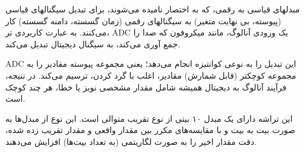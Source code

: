 
مبدلهای قیاسی به رقمی، که به اختصار  نامیده می‌شوند، برای تبدیل سیگنالهای قیاسی (پیوسته، بی نهایت متغیر) به سیگنالهای رقمی (زمان گسسته، دامنه گسسته) کار می‌کنند. به عبارت کاربردی تر، ADC یک ورودی آنالوگ، مانند میکروفون که صدا را جمع آوری می‌کند، به سیگنال دیجیتال تبدیل می‌کند.

ADC
این تبدیل را به نوعی کوانتیزه انجام می‌دهد؛ یعنی مجموعه پیوسته مقادیر را به مجموعه کوچکتر (قابل شمارش) مقادیر، اغلب با گرد کردن، ترسیم می‌کند. در نتیجه، فرآیند آنالوگ به دیجیتال همیشه شامل مقدار مشخصی نویز یا خطا، هر چند کوچک است.

این تراشه دارای یک مبدل ۱۰ بیتی از نوع تقریب متوالی است. این نوع از مبدل‌ها به صورت بیت به بیت و با مقایسه‌های مکرر بین مقدار واقعی و مقدار تقریب زده شده، دقت مقدار اخیر را به صورت لگاریتمی (به تعداد بیت‌ها) افزایش می‌دهند.
